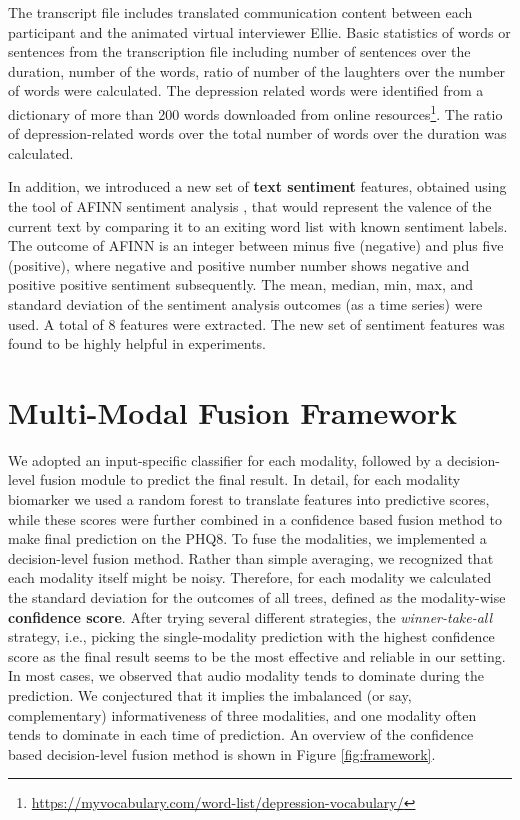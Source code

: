 \documentclass[letterpaper]{article} %
\begin{document}
The transcript file includes translated communication content between each participant and the animated virtual interviewer Ellie. Basic statistics of words or sentences from the transcription file including number of sentences over the duration, number of the words, ratio of number of the laughters over the number of words were calculated. The depression related words were identified from a dictionary of more than 200 words downloaded from online resources\footnote{\url{https://myvocabulary.com/word-list/depression-vocabulary/}}. The ratio of depression-related words over the total number of words over the duration was calculated.

In addition, we introduced a new set of \textbf{text sentiment} features, obtained using the tool of AFINN sentiment analysis \cite{nielsen2011new}, that would represent the valence of the current text by comparing it to an exiting word list with known sentiment labels. The outcome of AFINN is an integer between minus five (negative) and plus five (positive), where negative and positive number number shows negative and positive positive sentiment subsequently. The mean, median, min, max, and standard deviation of the sentiment analysis outcomes (as a time series) were used. A total of 8 features were extracted. The new set of sentiment features was found to be highly helpful in experiments.

\vspace{-3.10mm}
\section{Multi-Modal Fusion Framework}

We adopted an input-specific classifier for each modality, followed by a decision-level fusion module to predict the final result. In detail, for each modality biomarker we used a random forest to translate features into predictive scores, while these scores were further combined in a confidence based fusion method to make final prediction on the PHQ8. To fuse the modalities, we implemented a decision-level fusion method. Rather than simple averaging, we recognized that each modality itself might be noisy. Therefore, for each modality we calculated the standard deviation for the outcomes of all trees, defined as the modality-wise \textbf{confidence score}. After trying several different strategies, the \textit{winner-take-all} strategy, i.e., picking the single-modality prediction with the highest confidence score as the final result seems to be the most effective and reliable in our setting. In most cases, we observed that audio modality tends to dominate during the prediction. We conjectured that it implies the imbalanced (or say, complementary) informativeness of three modalities, and one modality often tends to dominate in each time of prediction. An overview of the confidence based decision-level fusion method is shown in Figure \ref{fig:framework}.
\end{document}
